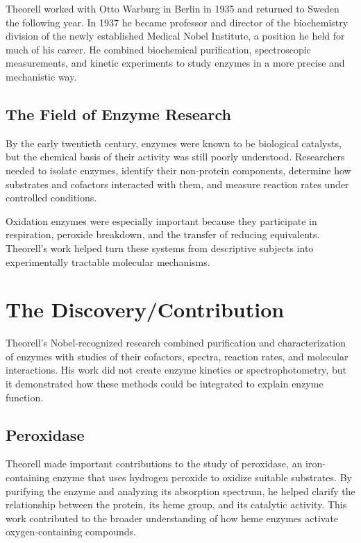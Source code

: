 Theorell worked with Otto Warburg in Berlin in 1935 and returned to Sweden the following year. In 1937 he became professor and director of the biochemistry division of the newly established Medical Nobel Institute, a position he held for much of his career. He combined biochemical purification, spectroscopic measurements, and kinetic experiments to study enzymes in a more precise and mechanistic way.

\subsection{The Field of Enzyme Research}

By the early twentieth century, enzymes were known to be biological catalysts, but the chemical basis of their activity was still poorly understood. Researchers needed to isolate enzymes, identify their non-protein components, determine how substrates and cofactors interacted with them, and measure reaction rates under controlled conditions.

Oxidation enzymes were especially important because they participate in respiration, peroxide breakdown, and the transfer of reducing equivalents. Theorell's work helped turn these systems from descriptive subjects into experimentally tractable molecular mechanisms.

\section{The Discovery/Contribution}

Theorell's Nobel-recognized research combined purification and characterization of enzymes with studies of their cofactors, spectra, reaction rates, and molecular interactions. His work did not create enzyme kinetics or spectrophotometry, but it demonstrated how these methods could be integrated to explain enzyme function.

\subsection{Peroxidase}

Theorell made important contributions to the study of peroxidase, an iron-containing enzyme that uses hydrogen peroxide to oxidize suitable substrates. By purifying the enzyme and analyzing its absorption spectrum, he helped clarify the relationship between the protein, its heme group, and its catalytic activity. This work contributed to the broader understanding of how heme enzymes activate oxygen-containing compounds.

